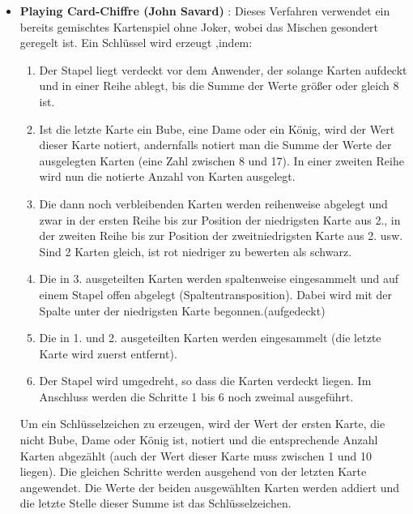 \begin{refsegment}
\begin{itemize}
\begin{itemize}
      \item {\bf Playing Card-Chiffre (John Savard)} \cite{Savard1999}:
         Dieses Verfahren verwendet ein bereits gemischtes Kartenspiel ohne
         Joker, wobei das Mischen gesondert geregelt ist. Ein Schlüssel wird
         erzeugt ,indem:
         \begin{enumerate}
            \item Der Stapel liegt verdeckt vor dem Anwender, der solange
               Karten aufdeckt und in einer Reihe ablegt, bis die Summe der
               Werte größer oder gleich 8 ist.
            \item Ist die letzte Karte ein Bube, eine Dame oder ein König,
               wird der Wert dieser Karte notiert, andernfalls notiert man die
               Summe der Werte der ausgelegten Karten (eine Zahl zwischen 8 und
               17). In einer zweiten Reihe wird nun die notierte Anzahl von
               Karten ausgelegt.
            \item Die dann noch verbleibenden Karten werden reihenweise
               abgelegt und zwar in der ersten Reihe bis zur Position der
               niedrigsten Karte aus 2., in der zweiten Reihe bis zur Position
               der zweitniedrigsten Karte aus 2. usw. Sind 2 Karten gleich,
               ist rot niedriger zu bewerten als schwarz.
            \item Die in 3. ausgeteilten Karten werden spaltenweise
               eingesammelt und auf einem Stapel offen abgelegt
               (Spaltentransposition).
               Dabei wird mit der Spalte unter der niedrigsten Karte
	       begonnen.(aufgedeckt)
            \item Die in 1. und 2. ausgeteilten Karten werden eingesammelt
               (die letzte Karte wird zuerst entfernt).
            \item Der Stapel wird umgedreht, so dass die Karten verdeckt
               liegen. Im Anschluss werden die Schritte 1 bis 6 noch zweimal
               ausgeführt.
         \end{enumerate}
         Um ein Schlüsselzeichen zu erzeugen, wird der Wert der ersten Karte,
         die nicht Bube, Dame oder König ist, notiert und die entsprechende
         Anzahl Karten abgezählt (auch der Wert dieser Karte muss zwischen 1
         und 10	liegen). Die gleichen Schritte werden ausgehend von der letzten
         Karte angewendet. Die Werte der beiden ausgewählten Karten werden
         addiert und die letzte Stelle dieser Summe ist das Schlüsselzeichen.\\
   \end{itemize}


\end{itemize}
\end{refsegment}

